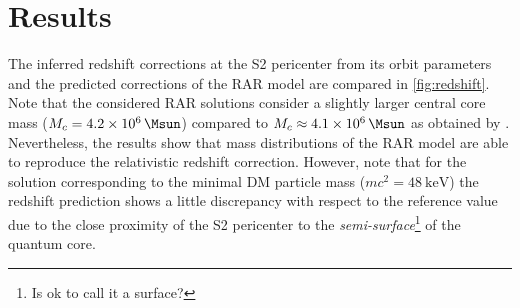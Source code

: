 \section{Results}
The inferred redshift corrections at the S2 pericenter from its orbit parameters and the predicted corrections of the RAR model are compared in \cref{fig:redshift}. Note that the considered RAR solutions consider a slightly larger central core mass ($M_c = \SI{4.2E6}{\Msun}$) compared to $M_c \approx \SI{4.1E6}{\Msun}$ as obtained by \citet{2018A&A...615L..15G}. Nevertheless, the results show that mass distributions of the RAR model are able to reproduce the relativistic redshift correction. However, note that for the solution corresponding to the minimal DM particle mass ($mc^2 = \SI{48}{\kilo\eV}$) the redshift prediction shows a little discrepancy with respect to the reference value due to the close proximity of the S2 pericenter to the \textit{semi-surface}\footnote{Is ok to call it a surface?} of the quantum core.

